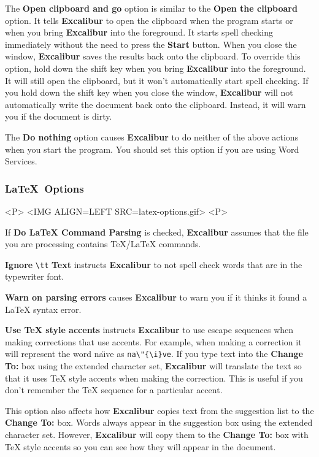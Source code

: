 ﻿\documentclass[11pt,titlepage]{article}
\newcommand{\ex}{\textbf{Excalibur}}
\begin{document}
The \textbf{Open clipboard and go} option is similar to the
\textbf{Open the clipboard} option.  It tells \ex{} to open the
clipboard when the program starts or when you bring \ex{} into the
foreground.  It starts spell checking immediately without the need to
press the \textbf{Start} button.  When you close the window, \ex{}
saves the results back onto the clipboard.  To override this option,
hold down the shift key when you bring \ex{} into the foreground.  It
will still open the clipboard, but it won't automatically start spell
checking.  If you hold down the shift key when you close the window,
\ex{} will not automatically write the document back onto the
clipboard.  Instead, it will warn you if the document is dirty.

The \textbf{Do nothing} option causes \ex{} to do neither of the above
actions when you start the program.  You should set this option if you
are using Word Services.

\subsubsection{\LaTeX\ Options}
\label{sec:latex-options}

\begin{rawhtml}
<P>
<IMG ALIGN=LEFT SRC=latex-options.gif>
<P>
\end{rawhtml}

If \textbf{Do \LaTeX{} Command Parsing} is checked, \ex{} assumes that
the file you are processing contains \TeX/\LaTeX{} commands.

\textbf{Ignore} \verb+\tt+ \textbf{Text} instructs \ex{} to not spell
check words that are in the typewriter font.

\textbf{Warn on parsing errors} causes \ex{} to warn you if it thinks
it found a \LaTeX{} syntax error.

\textbf{Use \TeX{} style accents} instructs \ex{} to use escape
sequences when making corrections that use accents.  For example, when
making a correction it will represent the word na\"{\i}ve as
\verb+na\"{\i}ve+.  If you type text into the \textbf{Change To:} box
using the extended character set, \ex{} will translate the text so
that it uses \TeX{} style accents when making the correction.  This is
useful if you don't remember the \TeX{} sequence for a particular
accent.

This option also affects how \ex{} copies text from the suggestion
list to the \textbf{Change To:} box.  Words always appear in the
suggestion box using the extended character set.  However, \ex{} will
copy them to the \textbf{Change To:} box with \TeX{} style accents so
you can see how they will appear in the document.
\end{document}
